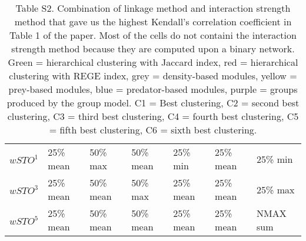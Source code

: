 \begin{table}[ht]
\begin{tabular}{lllllll}
\(\displaystyle wSTO^1 \) &   {\color[HTML]{00D768} 25\% mean} & {\color[HTML]{EF2A00} 50\% max} & {\color[HTML]{0051D7} 50\% mean} & {\color[HTML]{6200D7} 25\% min} & {\color{orange} 25\% mean} & {\color[HTML]{9B9B9B} 25\% min} \\ 
\(\displaystyle wSTO^3 \) &   {\color[HTML]{00D768} 25\% mean} & {\color[HTML]{EF2A00} 50\% mean} & {\color[HTML]{0051D7} 50\% max} & {\color[HTML]{6200D7} 25\% mean} & {\color{orange} 25\% mean} & {\color[HTML]{9B9B9B} 25\% max} \\ 
\(\displaystyle wSTO^5 \) &   {\color[HTML]{00D768} 25\% mean} & {\color[HTML]{EF2A00} 50\% mean} & {\color[HTML]{0051D7} 50\% mean} & {\color[HTML]{6200D7} 25\% mean} & {\color{orange} 25\% mean} & {\color[HTML]{9B9B9B} NMAX sum} \\ 
\end{tabular}
\caption{Table S2. Combination of linkage method and interaction strength method that gave us the highest Kendall's correlation coefficient in Table 1 of the paper. Most of the cells do not containi the interaction strength method because they are computed upon a binary network. {\color[HTML]{00D768} Green = hierarchical clustering with Jaccard index}, {\color[HTML]{EF2A00} red = hierarchical clustering with REGE index}, {\color[HTML]{9B9B9B} grey = density-based modules}, {\color{orange} yellow = prey-based modules}, {\color[HTML]{0051D7} blue = predator-based modules}, {\color[HTML]{6200D7} purple = groups produced by the group model}. C1 = Best clustering, C2 = second best clustering, C3 = third best clustering, C4 = fourth best clustering, C5 = fifth best clustering, C6 = sixth best clustering.}
\end{table}
